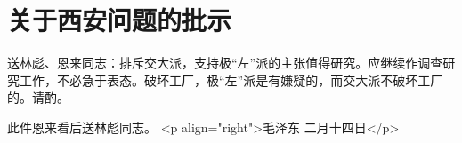 \section[关于西安问题的批示（一九六七年二月十四日）]{关于西安问题的批示}


送林彪、恩来同志：排斥交大派，支持极“左”派的主张值得研究。应继续作调查研究工作，不必急于表态。破坏工厂，极“左”派是有嫌疑的，而交大派不破坏工厂的。请酌。

此件恩来看后送林彪同志。
<p align="right">毛泽东
二月十四日</p>


